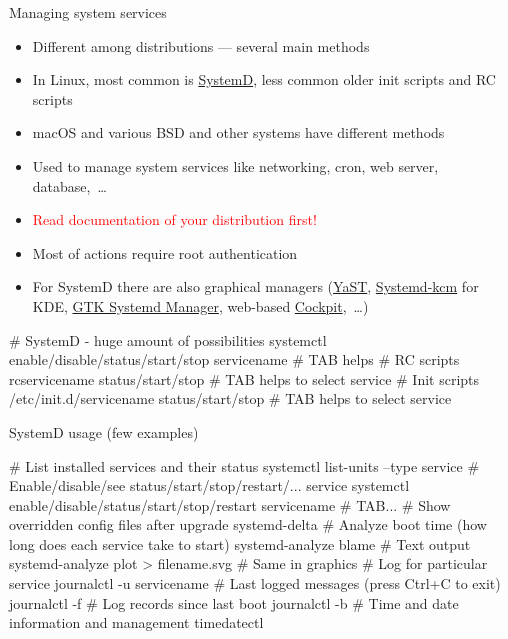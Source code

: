 \documentclass[compress, ucs, xelatex, 11pt, xcolor=svgnames, aspectratio=169,
	hyperref={
		bookmarks=true,
		unicode=true,
		colorlinks=true,
		pdftitle={Linux, command line and MetaCentrum},
		plainpages=false,
		pdfauthor={Vojtech Zeisek},
		pdfsubject={Course about use of Linux command line, writing shell scripts and using MetaCentrum of CESNET},
		pdfcreator={XeLaTeX},
		pdfkeywords={Linux, GNU, BASH, shell, command line, MetaCentrum},
		linkcolor=DarkRed, %
		anchorcolor=DarkBlue, %
		citecolor=Indigo, %
		filecolor=NavyBlue, %
		menucolor=DarkMagenta, %
		urlcolor=DarkBlue, %
		pdftex},
	url={hyphens, lowtilde} %
	]{beamer}
\renewcommand{\alert}[1]{\textcolor{red}{#1}}
\begin{document}
\begin{frame}[fragile]{Managing system services}
	\begin{itemize}
		\item Different among distributions --- several main methods
		\item In Linux, most common is \href{https://wiki.freedesktop.org/www/Software/systemd/}{SystemD}, less common older init scripts and RC scripts
		\item macOS and various BSD and other systems have different methods
		\item Used to manage system services like networking, cron, web server, database,~\ldots
		\item \alert{Read documentation of your distribution first!}
		\item Most of actions require root authentication
		\item For SystemD there are also graphical managers (\href{https://doc.opensuse.org/documentation/leap/reference/html/book-reference/cha-systemd.html#sec-boot-runlevel-edit}{YaST}, \href{https://store.kde.org/p/1127873/}{Systemd-kcm} for KDE, \href{https://github.com/GuillaumeGomez/systemd-manager}{GTK Systemd Manager}, web-based \href{https://cockpit-project.org/}{Cockpit},~\ldots)
	\end{itemize}
	\vfill
	\begin{bashcode}
    # SystemD - huge amount of possibilities
    systemctl enable/disable/status/start/stop servicename # TAB helps
    # RC scripts
    rcservicename status/start/stop # TAB helps to select service
    # Init scripts
    /etc/init.d/servicename status/start/stop # TAB helps to select service
	\end{bashcode}
\end{frame}

\begin{frame}[fragile]{SystemD usage (few examples)}
	\begin{bashcode}
    # List installed services and their status
    systemctl list-units --type service
    # Enable/disable/see status/start/stop/restart/... service
    systemctl enable/disable/status/start/stop/restart servicename # TAB...
    # Show overridden config files after upgrade
    systemd-delta
    # Analyze boot time (how long does each service take to start)
    systemd-analyze blame # Text output
    systemd-analyze plot > filename.svg # Same in graphics
    # Log for particular service
    journalctl -u servicename
    # Last logged messages (press Ctrl+C to exit)
    journalctl -f
    # Log records since last boot
    journalctl -b
    # Time and date information and management
    timedatectl
	\end{bashcode}
\end{frame}
\end{document}
